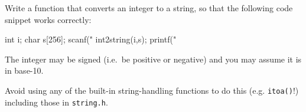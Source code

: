 
\begin{exercise}
Write a function that converts an integer
to a string, so that the following code snippet
works correctly:

\begin{codesnippet}
int i;
char s[256];
scanf("%
int2string(i,s);
printf("%
\end{codesnippet}

The integer may be signed (i.e.\ be positive or negative)
and you may assume it is in base-10.

Avoid using any of the built-in string-handling functions
to do this (e.g. \verb^itoa()^!) including those in \verb^string.h^.
\end{exercise}

